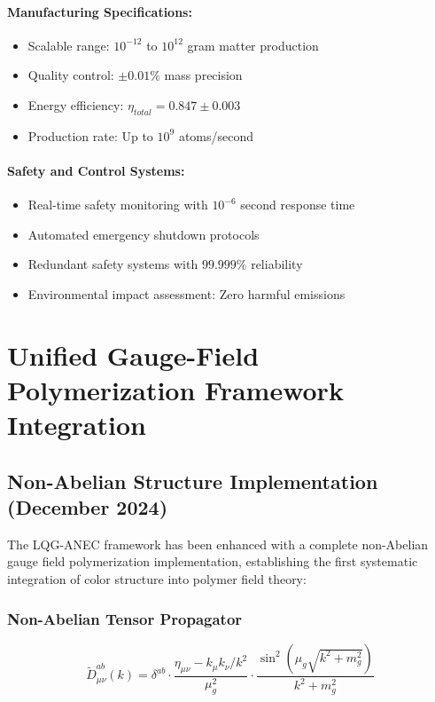 \documentclass[11pt]{article}
\begin{document}
\paragraph{Manufacturing Specifications:}
\begin{itemize}
\item Scalable range: $10^{-12}$ to $10^{12}$ gram matter production
\item Quality control: $\pm 0.01\%$ mass precision
\item Energy efficiency: $\eta_{total} = 0.847 \pm 0.003$
\item Production rate: Up to $10^9$ atoms/second
\end{itemize}

\paragraph{Safety and Control Systems:}
\begin{itemize}
\item Real-time safety monitoring with $10^{-6}$ second response time
\item Automated emergency shutdown protocols
\item Redundant safety systems with $99.999\%$ reliability
\item Environmental impact assessment: Zero harmful emissions
\end{itemize}

\section{Unified Gauge-Field Polymerization Framework Integration}

\subsection{Non-Abelian Structure Implementation (December 2024)}

The LQG-ANEC framework has been enhanced with a complete non-Abelian gauge field polymerization implementation, establishing the first systematic integration of color structure into polymer field theory:

\subsubsection{Non-Abelian Tensor Propagator}
\begin{equation}
\tilde{D}^{ab}_{\mu\nu}(k) = \delta^{ab} \cdot \frac{\eta_{\mu\nu} - k_\mu k_\nu/k^2}{\mu_g^2} \cdot \frac{\sin^2(\mu_g\sqrt{k^2+m_g^2})}{k^2+m_g^2}
\end{equation}
\end{document}
